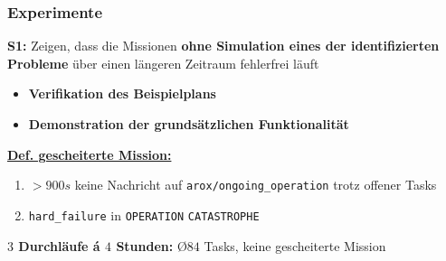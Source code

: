 \documentclass{beamer}
\newcommand{\code}[1]{\colorbox{light-gray}{\texttt{#1}}}
\begin{document}
\begin{frame}
  \frametitle{Experimente}
  \textbf{S1:} Zeigen, dass die Missionen \textbf{ohne Simulation eines der identifizierten Probleme} über einen längeren Zeitraum fehlerfrei läuft
  \begin{itemize}
    \item \textbf{Verifikation des Beispielplans}
    \item \textbf{Demonstration der grundsätzlichen Funktionalität}
  \end{itemize}
  \underline{\textbf{Def. gescheiterte Mission:}}
  \begin{enumerate}
    \item $> 900s$ keine Nachricht auf \code{arox/ongoing\_operation} trotz offener Tasks
    \item \code{hard\_failure} in \code{OPERATION} \textrightarrow \thinspace \code{CATASTROPHE}
  \end{enumerate}
  \textbf{$3$ Durchläufe á $4$ Stunden:}\newline
  \textrightarrow \thinspace \O $84$ Tasks, keine gescheiterte Mission
\end{frame}
\end{document}
